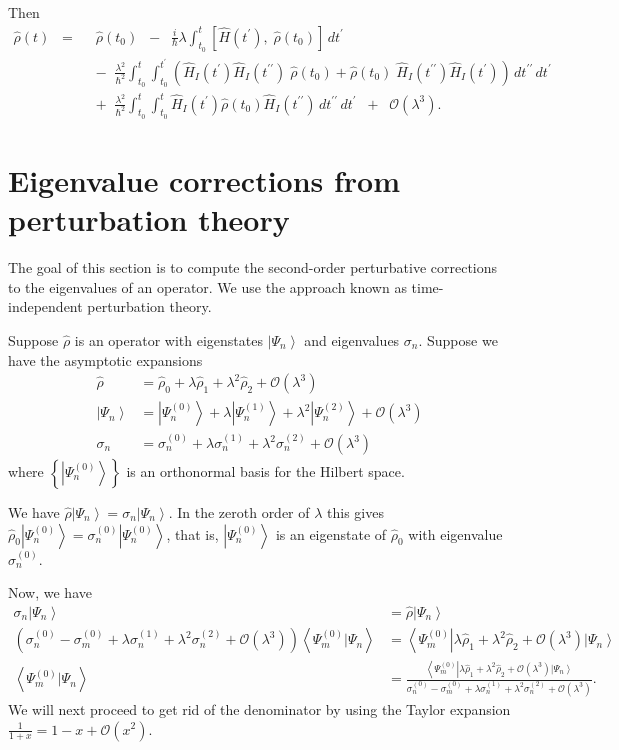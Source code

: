 \documentclass[11pt]{article}
\newcommand{\Od}[1]{\mathcal{O}{\left(#1\right)}}
\newcommand{\bra}[1]{\left\langle#1\right|}
\newcommand{\ket}[1]{\left|#1\right\rangle}
\newcommand{\braket}[2]{\left\langle#1|#2\right\rangle}
\newcommand{\op}[1]{\hat{#1}}
\theoremstyle{theorem}
\theoremstyle{remark}
\theoremstyle{step}
\theoremstyle{gap}
\begin{document}
Then
\begin{align}
\label{eq.rhoevol}
\op{\rho}(t) \;\;=\;\;& \op{\rho}\left(t_0\right)
\;\;-\;\;\frac{i}{\hbar}\lambda \int_{t_0}^t \left[\op{H}(t^\prime),\; \op{\rho}(t_0) \right] \,dt^\prime \\
& -\;\; \frac{\lambda^2}{\hbar^2} \int_{t_0}^t \int_{t_0}^{t^\prime} \left( \op{H}_I (t^\prime) \op{H}_I(t^{\prime\prime}) \;\op{\rho}(t_0) + \op{\rho}(t_0)\; \op{H}_I (t^{\prime\prime}) \op{H}_I(t^{\prime}) \right)\,dt^{\prime\prime}\,dt^\prime \nonumber\\
&+\;\; \frac{\lambda^2}{\hbar^2} \int_{t_0}^t \int_{t_0}^{t} \op{H}_I (t^\prime) \op{\rho}(t_0) \op{H}_I (t^{\prime\prime})\,dt^{\prime\prime}\,dt^\prime \;\;+\;\; \Od{\lambda^3}\nonumber.
\end{align}

\section{Eigenvalue corrections from perturbation theory}

The goal of this section is to compute the second-order perturbative corrections to the eigenvalues of an operator. We use the approach known as time-independent perturbation theory.

Suppose \(\op{\rho}\) is an operator with eigenstates \(\ket{\Psi_n}\) and eigenvalues \(\sigma_n\). Suppose we have the asymptotic expansions
\begin{align*}
\op{\rho} &= \op{\rho}_0 + \lambda \op{\rho}_1 + \lambda^2 \op{\rho}_2 + \Od{\lambda^3} \\
\ket{\Psi_n} &= \ket{\Psi_n^{(0)}} + \lambda \ket{\Psi_n^{(1)}} + \lambda^2 \ket{\Psi_n^{(2)}} + \Od{\lambda^3} \\
\sigma_n &= \sigma_n^{(0)} + \lambda \sigma_n^{(1)} + \lambda^2 \sigma_n^{(2)} + \Od{\lambda^3}
\end{align*}
where \(\left\{\ket{\Psi_n^{(0)}}\right\}\) is an orthonormal basis for the Hilbert space.

We have \(\op{\rho} \ket{\Psi_n} = \sigma_n \ket{\Psi_n}\). In the zeroth order of \(\lambda\) this gives \(\op{\rho}_0 \ket{\Psi_n^{(0)}} = \sigma_n^{(0)} \ket{\Psi_n^{(0)}}\), that is, \(\ket{\Psi_n^{(0)}}\) is an eigenstate of \(\op{\rho}_0\) with eigenvalue \(\sigma_n^{(0)}\).

Now, we have
\begin{align*}
\sigma_n \ket{\Psi_n} &= \op{\rho}\ket{\Psi_n}\\
\left(\sigma_n^{(0)} - \sigma_m^{(0)} + \lambda \sigma_n^{(1)} + \lambda^2 \sigma_n^{(2)} + \Od{\lambda^3} \right)\braket{\Psi_m^{(0)}}{\Psi_n} &=\bra{\Psi_m^{(0)}} \lambda \op{\rho}_1 + \lambda^2 \op{\rho}_2 + \Od{\lambda^3} \ket{\Psi_n} \\
\braket{\Psi_m^{(0)}}{\Psi_n} &=\frac{\bra{\Psi_m^{(0)}} \lambda \op{\rho}_1 + \lambda^2 \op{\rho}_2 + \Od{\lambda^3} \ket{\Psi_n}}{\sigma_n^{(0)} - \sigma_m^{(0)} + \lambda \sigma_n^{(1)} + \lambda^2 \sigma_n^{(2)} + \Od{\lambda^3}}.
\end{align*}
We will next proceed to get rid of the denominator by using the Taylor expansion \(\frac{1}{1+x} = 1-x +\Od{x^2}\).
\end{document}
